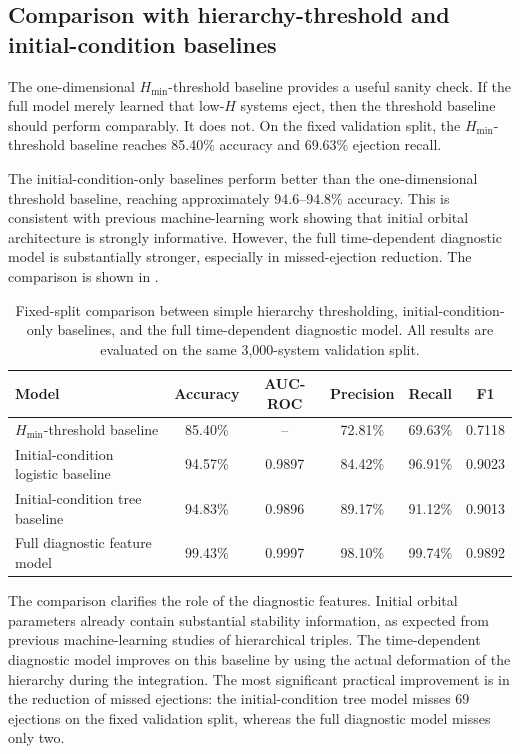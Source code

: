 \documentclass[12pt,a4paper]{article}
\newcommand{\Hmin}{H_{\min}}
\begin{document}
\subsection{Comparison with hierarchy-threshold and initial-condition baselines}
\label{sec:baseline_comparison}

The one-dimensional \(\Hmin\)-threshold baseline provides a useful sanity check. If the full model merely learned that low-\(H\) systems eject, then the threshold baseline should perform comparably. It does not. On the fixed validation split, the \(\Hmin\)-threshold baseline reaches 85.40\% accuracy and 69.63\% ejection recall.

The initial-condition-only baselines perform better than the one-dimensional threshold baseline, reaching approximately 94.6--94.8\% accuracy. This is consistent with previous machine-learning work showing that initial orbital architecture is strongly informative. However, the full time-dependent diagnostic model is substantially stronger, especially in missed-ejection reduction. The comparison is shown in .

\begin{table}[H]
\centering
\caption{Fixed-split comparison between simple hierarchy thresholding, initial-condition-only baselines, and the full time-dependent diagnostic model. All results are evaluated on the same 3,000-system validation split.}
\label{tab:baseline_comparison}
\begin{tabular}{lccccc}
\toprule
Model & Accuracy & AUC-ROC & Precision & Recall & F1 \\
\midrule
\(\Hmin\)-threshold baseline & 85.40\% & -- & 72.81\% & 69.63\% & 0.7118 \\
Initial-condition logistic baseline & 94.57\% & 0.9897 & 84.42\% & 96.91\% & 0.9023 \\
Initial-condition tree baseline & 94.83\% & 0.9896 & 89.17\% & 91.12\% & 0.9013 \\
Full diagnostic feature model & 99.43\% & 0.9997 & 98.10\% & 99.74\% & 0.9892 \\
\bottomrule
\end{tabular}
\end{table}

The comparison clarifies the role of the diagnostic features. Initial orbital parameters already contain substantial stability information, as expected from previous machine-learning studies of hierarchical triples. The time-dependent diagnostic model improves on this baseline by using the actual deformation of the hierarchy during the integration. The most significant practical improvement is in the reduction of missed ejections: the initial-condition tree model misses 69 ejections on the fixed validation split, whereas the full diagnostic model misses only two.
\end{document}
